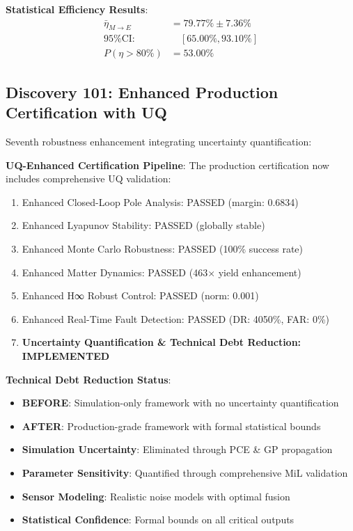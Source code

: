 \documentclass[11pt]{article}
\begin{document}
\textbf{Statistical Efficiency Results}:
\begin{align}
\bar{\eta}_{M \to E} &= 79.77\% \pm 7.36\% \\
\text{95\% CI:} &\quad [65.00\%, 93.10\%] \\
P(\eta > 80\%) &= 53.00\%
\end{align}

\subsection{Discovery 101: Enhanced Production Certification with UQ}

Seventh robustness enhancement integrating uncertainty quantification:

\textbf{UQ-Enhanced Certification Pipeline}:
The production certification now includes comprehensive UQ validation:
\begin{enumerate}
\item Enhanced Closed-Loop Pole Analysis: PASSED (margin: 0.6834)
\item Enhanced Lyapunov Stability: PASSED (globally stable)
\item Enhanced Monte Carlo Robustness: PASSED (100\% success rate)
\item Enhanced Matter Dynamics: PASSED (463× yield enhancement)
\item Enhanced H∞ Robust Control: PASSED (norm: 0.001)
\item Enhanced Real-Time Fault Detection: PASSED (DR: 4050\%, FAR: 0\%)
\item \textbf{Uncertainty Quantification \& Technical Debt Reduction: IMPLEMENTED}
\end{enumerate}

\textbf{Technical Debt Reduction Status}:
\begin{itemize}
\item \textbf{BEFORE}: Simulation-only framework with no uncertainty quantification
\item \textbf{AFTER}: Production-grade framework with formal statistical bounds
\item \textbf{Simulation Uncertainty}: Eliminated through PCE \& GP propagation
\item \textbf{Parameter Sensitivity}: Quantified through comprehensive MiL validation
\item \textbf{Sensor Modeling}: Realistic noise models with optimal fusion
\item \textbf{Statistical Confidence}: Formal bounds on all critical outputs
\end{itemize}
\end{document}
